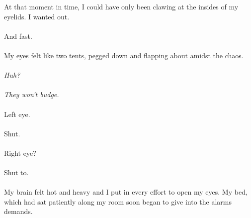 \documentclass{book}
\begin{document}
{{				   At that moment in time, I could have only been clawing at the insides of my eyelids.
				   I wanted out.\\\\
				   And fast.\\\\
				   My eyes felt like two tents, pegged down and flapping about amidst the chaos.\\\\
				   \textit{Huh?}\\\\
				   \textit{They won't budge.}\\\\
				   Left eye.\\\\
				   Shut.\\\\
				   Right eye?\\\\
				   Shut to.\\\\
				   My brain felt hot and heavy and I put in every effort to open my eyes.
				   My bed, which had sat patiently along my room soon began
				   to give into the alarms demands.\\\\}}
\end{document}
